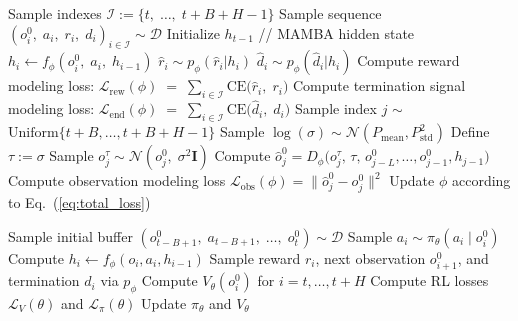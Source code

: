 {\begin{algorithm}[htbp]
\begin{algorithmic}[1]
  \STATE Sample indexes $\mathcal{I} := \{t,\; \dots,\; t + B + H - 1\}$ 
  \STATE Sample sequence $(o_i^0,\; a_i,\; r_i,\; d_i)_{i \in \mathcal{I}} \sim \mathcal{D}$
  \STATE Initialize $h_{t-1}$ // MAMBA hidden state
    \STATE $h_i \gets f_{\phi}(o_i^0,\; a_i, \; h_{i-1})$
    \STATE $\hat{r}_i \sim p_{\phi}(\hat{r}_i | h_i)$
    \STATE $\hat{d}_i \sim p_{\phi}(\hat{d}_i | h_i)$
  \ENDFOR
  \STATE Compute reward modeling loss: $\mathcal{L}_{\mathrm{rew}}(\phi) \;=\; \sum_{i \in \mathcal{I}} \mathrm{CE}\bigl(\hat{r}_i,\; r_i\bigr)$  
  \STATE Compute termination signal modeling loss: $\mathcal{L}_{\mathrm{end}}(\phi) \;=\; \sum_{i \in \mathcal{I}} \mathrm{CE}\bigl(\hat{d}_i,\;d_i\bigr)$  
  \STATE Sample index $j$ $\sim$ $\text{Uniform}\{t + B,\dots, t + B + H - 1\}$ 
  \STATE Sample $\log(\sigma) \sim \mathcal{N}(P_{\text{mean}}, P_{\text{std}}^2)$ 
  \STATE Define $\tau := \sigma$ 
  \STATE Sample $o_{j}^\tau \sim \mathcal{N}(o_{j}^0,\;\sigma^2\mathbf{I})$ 
  \STATE Compute $\hat{o}_{j}^0 = D_\phi\bigl(o_{j}^\tau,\,\tau,\,o_{j-L}^0,\dots,o_{j-1}^0, h_{j-1}\bigr)$
  \STATE Compute observation modeling loss $\mathcal{L}_{\mathrm{obs}}(\phi) = \|\hat{o}_{j}^0 - o_{j}^0\|^2$
  \STATE Update $\phi$ according to Eq.~(\ref{eq:total_loss})
\ENDFUNCTION

  \STATE Sample initial buffer $( o_{t-B+1}^0,\; a_{t-B+1},\;\dots,\;o_t^0 ) \sim \mathcal{D}$
  \STATE {}
    \STATE Sample $a_i \sim \pi_\theta(a_i \mid o_i^0)$
    \STATE Compute $h_i \gets f_\phi(o_i, a_i, h_{i-1})$
    \STATE Sample reward $r_i$, next observation $o_{i+1}^0$, and termination $d_i$ via $p_\phi$
  \ENDFOR
  \STATE Compute $V_\theta(o_i^0)$ for $i = t, \dots, t + H$
  \STATE Compute RL losses $\mathcal{L}_V(\theta)$ and $\mathcal{L}_\pi(\theta)$
  \STATE Update $\pi_\theta$ and $V_\theta$
\ENDFUNCTION

\end{algorithmic}
\end{algorithm}
}